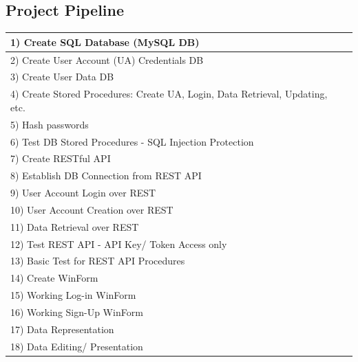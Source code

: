 \documentclass[a4paper,11pt]{proc}
\begin{document}
\begin{table}
\subsection{Project Pipeline}
\centering
\begin{tabular}{|lll|}
\hline
1) Create SQL Database (MySQL DB)                                           &  &  \\
\hline
2) Create User Account (UA) Credentials DB                              &  &  \\
\hline
3) Create User Data DB                                                    &  &  \\
\hline
4) Create Stored Procedures: Create UA, Login, Data Retrieval, Updating, etc. &  &  \\
\hline
5) Hash passwords                                                       &  &  \\
\hline
6) Test DB Stored Procedures - SQL Injection Protection                 &  &  \\
\hline
7) Create RESTful API                                                   &  &  \\
\hline
8) Establish DB Connection from REST API                                &  &  \\
\hline
9) User Account Login over REST                                         &  &  \\
\hline
10) User Account Creation over REST                                      &  &  \\
\hline
11) Data Retrieval over REST                                             &  &  \\
\hline
12) Test REST API - API Key/ Token Access only                           &  &  \\
\hline
13) Basic Test for REST API Procedures                                   &  &  \\
\hline
14) Create WinForm                                                       &  &  \\
\hline
15) Working Log-in WinForm                                               &  &  \\
\hline
16) Working Sign-Up WinForm                                              &  &  \\
\hline
17) Data Representation                                                  &  &  \\
\hline
18) Data Editing/ Presentation                                           &  &  \\

\end{tabular}
\end{table}
\end{document}
